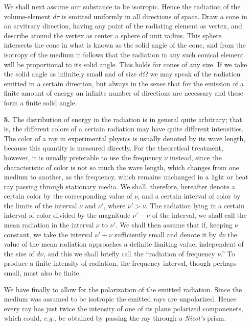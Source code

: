 \documentclass[12pt,oneside]{book}
\begin{document}
We shall next assume our substance to be isotropic. Hence the  radiation of the volume-element $d\tau$ is emitted uniformly in all directions of space. Draw a cone in an arvitrary direction, having any point of the radiating element as vertex, and describe around the vertex as center a sphere of unit radius. This sphere intersects the cone in what is known as the solid angle of the cone, and from the isotropy of the medium it follows that the radiation in any such conical element will be proportional to its solid angle. This holds for cones of any size. If we take the solid angle as infinitely small and of size $d\Omega$ we may speak of the radiation emitted in a certain direction, but always in the sense that for the emission of a finite amount of energy an infinite number of directions are necessary and these form a finite solid angle. \par

\textbf{5.} The distribution of energy in the radiation is in general quite arbitrary; that is, the different colors of a certain radiation may have quite different intensities. The color of a ray in experimental physics is usually denoted by its wave length, because this quantity is measured directly. For the theoretical treatment, however, it is usually preferable to use the frequency $\nu$ instead, since the characteristic of color is not so much the wave length, which changes from one medium to another, as the frequency, which remains unchanged in a light or heat ray passing through stationary media. We shall, therefore, hereafter denote a certain color by the corresponding value of $\nu$, and a certain interval of color by the limits of the interval $\nu$ and $\nu'$, where $\nu'>\nu$. The radiation lying in a certain interval of color divided by the magnitude $\nu'-\nu$ of the interval, we shall call the mean radiation in the interval $\nu$ to $\nu'$. We shall then assume that if, keeping $\nu$ constant, we take the interval $\nu'-\nu$ sufficiently small and denote it by $d\nu$ the value of the mean radiation approaches a definite limiting value, independent of the size of $d\nu$, and this we shall briefly call the ``radiation of frequency $\nu$.'' To produce a finite intensity of radiation, the frequency interval, though perhaps small, must also be finite. \par

We have finally to allow for the polarization of the emitted radiation. Since the medium was assumed to be isotropic the emitted rays are unpolarized. Hence every ray has just twice the intensity of one of its plane polarized componenets, which could, \textit{e.g.}, be obtained by passing the ray through a \textit{Nicol's} prism. \par
\end{document}
